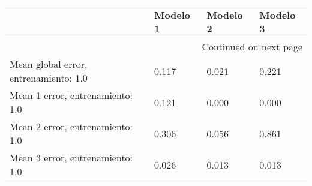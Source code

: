 \begin{longtable}{p{4cm}|p{2cm}|p{2cm}|p{2cm}}
\toprule
{} &  Modelo 1 &  Modelo 2 &  Modelo 3 \\
\midrule
\endhead
\midrule
\multicolumn{4}{r}{{Continued on next page}} \\
\midrule
\endfoot

\bottomrule
\endlastfoot
Mean global error, entrenamiento: 1.0 &     0.117 &     0.021 &     0.221 \\
Mean 1 error, entrenamiento: 1.0      &     0.121 &     0.000 &     0.000 \\
Mean 2 error, entrenamiento: 1.0      &     0.306 &     0.056 &     0.861 \\
Mean 3 error, entrenamiento: 1.0      &     0.026 &     0.013 &     0.013 \\
\end{longtable}
